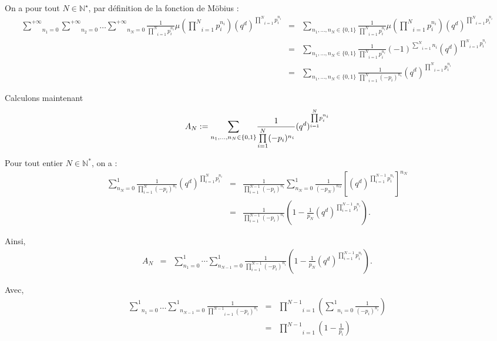 On a pour tout $N \in \mathbb{N}^{\star}$, par d{\'e}finition de la fonction
de M{\"o}bius :
\begin{eqnarray*}
  \underset{n_1 = 0}{\overset{+ \infty}{\sum}}  \underset{n_2 = 0}{\overset{+
  \infty}{\sum}} \ldots \underset{n_N = 0}{\overset{+ \infty}{\sum}}
  \frac{1}{\underset{i = 1}{\overset{N}{\prod}} p^{n_i}_i} \mu \left(
  \underset{i = 1}{\overset{N}{\prod}} p^{n_i}_i \right) (q^d)^{\underset{i =
  1}{\overset{N}{\prod}} p^{n_i}_i} & = & \underset{n_1, \ldots, n_N \in \{ 0,
  1 \}}{\overset{}{\sum}} \frac{1}{\underset{i = 1}{\overset{N}{\prod}}
  p^{n_i}_i} \mu \left( \underset{i = 1}{\overset{N}{\prod}} p^{n_i}_i \right)
  (q^d)^{\underset{i = 1}{\overset{N}{\prod}} p^{n_i}_i}\\
  & = & \underset{n_1, \ldots, n_N \in \{ 0, 1 \}}{\overset{}{\sum}}
  \frac{1}{\underset{i = 1}{\overset{N}{\prod}} p^{n_i}_i} {(- 1)^{\underset{i
  = 1}{\overset{N}{\sum}} n_i}}  (q^d)^{\underset{i = 1}{\overset{N}{\prod}}
  p^{n_i}_i}\\
  & = & \underset{n_1, \ldots, n_N \in \{ 0, 1 \}}{\overset{}{\sum}}
  \frac{1}{\underset{i = 1}{\overset{N}{\prod}} (- p_i)^{n_i}}
  (q^d)^{\underset{i = 1}{\overset{N}{\prod}} p^{n_i}_i}
\end{eqnarray*}


Calculons maintenant
\[ A_N := \underset{n_1, \ldots, n_N \in \{ 0, 1 \}}{\overset{}{\sum}}
   \frac{1}{\underset{i = 1}{\overset{N}{\prod}} (- p_i)^{n_i}}
   (q^d)^{\underset{i = 1}{\overset{N}{\prod}} p^{n_i}_i} \]


Pour tout entier $N \in \mathbb{N}^{\ast}$, on a :
\begin{eqnarray*}
\sum_{n_N=0}^{1} \frac{1}{\prod_{i=1}^{N} (-p_i)^{n_i}} (q^d)^{\prod_{i=1}^{N} p_i^{n_i}}
& = & \frac{1}{\prod_{i=1}^{N-1} (-p_i)^{n_i}} \sum_{n_N=0}^{1} \frac{1}{(-p_N)^{n_N}} \left[(q^d)^{\prod_{i=1}^{N-1} p_i^{n_i}}\right]^{n_N} \\[1em]
& = & \frac{1}{\prod_{i=1}^{N-1} (-p_i)^{n_i}} \left( 1 - \frac{1}{p_N}(q^d)^{\prod_{i=1}^{N-1} p_i^{n_i}} \right).
\end{eqnarray*}



Ainsi,
\begin{eqnarray*}
A_N &=& \sum_{n_1=0}^{1} \cdots \sum_{n_{N-1}=0}^{1} \frac{1}{\prod_{i=1}^{N-1} (-p_i)^{n_i}} 
\left( 1 - \frac{1}{p_N}\left(q^d\right)^{\prod_{i=1}^{N-1} p_i^{n_i}} \right).
\end{eqnarray*}


Avec,
\begin{eqnarray*}
  \underset{n_1 = 0}{\overset{1}{\sum}} \ldots \underset{n_{N - 1} =
  0}{\overset{1}{\sum}} \frac{1}{\underset{}{\underset{i = 1}{\overset{N -
  1}{\prod}}} (- p_i)^{n_i}} & = & \underset{i = 1}{\overset{N - 1}{\prod}}
  \left( \underset{n_i = 0}{\overset{1}{\sum}} \frac{1}{(- p_i)^{n_i}}
  \right)\\
  & = & \underset{i = 1}{\overset{N - 1}{\prod}} \left( 1 - \frac{1}{p_i}
  \right)
\end{eqnarray*}


